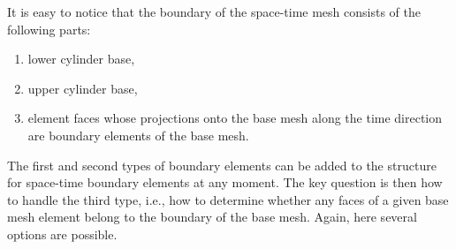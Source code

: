 \documentclass[12pt]{article}
\newcommand{\myGlobalTransformation}[2]
{
    \pgftransformcm{1}{0}{0.4}{0.5}{\pgfpoint{#1cm}{#2cm}}
}
\newcommand{\graphThreeDnodes}[2]
{
    \begin{scope}
        \myGlobalTransformation{#1}{#2};
        \foreach \x in {1,3,5,7} {
            \foreach \y in {1,3,5,7} {
                \node at (\x,\y) [circle,fill=black] {};
            }
        }
    \end{scope}
}
\begin{document}
%
%
%
%
%
%        
%        
%        
%        


It is easy to notice that the boundary of the space-time mesh consists of the following parts: 
\begin{enumerate}
	\item lower cylinder base, 
	\item upper cylinder base,
	\item element faces whose projections onto the base mesh along the time direction are boundary elements of the base mesh.
\end{enumerate}
The first and second types of boundary elements can be added to the structure for space-time boundary elements at any moment. The key question is then how to handle the third type, i.e., how to determine whether any faces of a given base mesh element belong to the boundary of the base mesh. Again, here several options are possible. 
\end{document}
